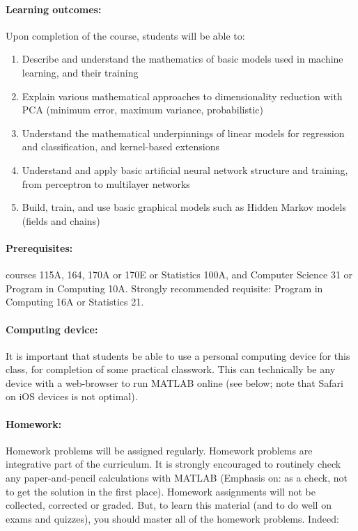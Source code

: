 \documentclass[11pt,letter]{article}
\begin{document}
\paragraph{Learning outcomes:} Upon completion of the course, students will be able to:
\begin{enumerate}\small\setlength\itemsep{-0.2em}
\item Describe and understand the mathematics of basic models used in machine learning, and their training
\item Explain various mathematical approaches to dimensionality reduction with PCA (minimum error, maximum variance, probabilistic)
\item Understand the mathematical underpinnings of linear models for regression and classification, and kernel-based extensions
\item Understand and apply basic artificial neural network structure and training, from perceptron to multilayer networks
\item Build, train, and use basic graphical models such as Hidden Markov models (fields and chains)
\end{enumerate}

\paragraph{Prerequisites:}  courses 115A, 164, 170A or 170E or Statistics 100A, and Computer Science 31 or Program in Computing 10A. Strongly recommended requisite: Program in Computing 16A or Statistics 21. 



\paragraph{Computing device:} It is important that students be able to use a personal computing device for this class, for completion of some practical classwork. This can technically be any device with a web-browser to run MATLAB online (see below; note that Safari on iOS devices is not optimal). 

\paragraph{Homework:} Homework problems will be assigned regularly. Homework problems are integrative part of the curriculum. It is strongly encouraged to routinely check any paper-and-pencil calculations with MATLAB (Emphasis on: as a check, not to get the solution in the first place). Homework assignments will not be collected, corrected or graded. But, to learn this material (and to do well on exams and quizzes), you should master all of the homework problems. Indeed:
\end{document}
